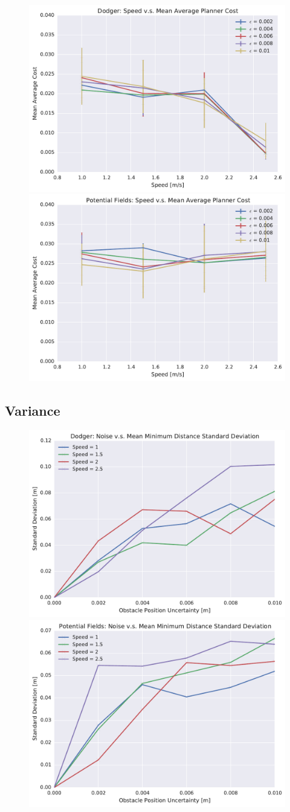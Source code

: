 \begin{figure}[h!]
    \centering
    \includegraphics[width=0.48\linewidth]{figs/planner_mean_avg_cost_0}
    \includegraphics[width=0.48\linewidth]{figs/pf_mean_avg_cost_0}
    \caption{}
    \label{fig:plot_avg_cost}
\end{figure}

\subsection{Variance}

\begin{figure}[h!]
    \centering
    \includegraphics[width=0.48\linewidth]{figs/planner_std_min_distance_0}
    \includegraphics[width=0.48\linewidth]{figs/pf_std_min_distance_0}
    \caption{}
    \label{fig:plot_std_min_distance}
\end{figure}

